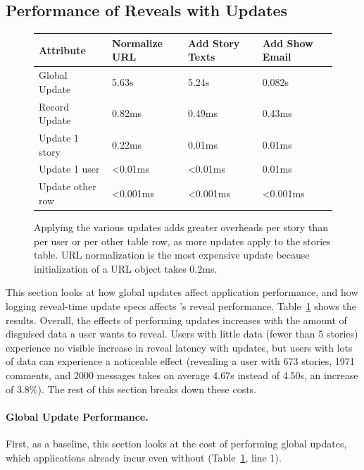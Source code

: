 \subsection{Performance of Reveals with Updates}
\label{s:eval:updates}

\begin{figure}
    \centering
    \begin{tabular}{m{}|m{}|m{}|m{}}
        \centering\textbf{Attribute} & \textbf{Normalize URL} & \textbf{Add Story Texts} &
        \textbf{Add Show Email} \\
        \hline
        Global Update & 5.63s & 5.24s & 0.082s\\
        \hline
        Record Update & 0.82ms & 0.49ms & 0.43ms \\
        \hline
        Update 1 story & 0.22ms & 0.01ms & 0.01ms \\
        \hline
        Update 1 user & <0.01ms & <0.01ms & 0.01ms \\
        \hline
        Update other row & <0.001ms & <0.001ms & <0.001ms \\
    \end{tabular}
    \caption[Overheads of global updates and reveal-time updates.]{Applying the various updates adds greater overheads per story than
    per user or per other table row, as more updates apply to the stories table.
    URL normalization is the most expensive update because initialization of a
    URL object takes 0.2ms.}
    \label{tab:updates-perf}
\end{figure}

This section looks at how global updates affect application performance, and how
logging reveal-time update specs affects \sys's reveal performance.
Table~\ref{tab:updates-perf} shows the results.
%
Overall, the effects of performing updates increases with the amount of
disguised data a user wants to reveal.
%
Users with little data (\eg fewer than 5 stories) experience no visible increase
in reveal latency with updates, but users with lots of data can experience a
noticeable effect (\eg revealing a user with 673 stories, 1971 comments, and 2000
messages takes on average 4.67s instead of 4.50s, an increase of 3.8\%).
%
The rest of this section breaks down these costs.
%

\paragraph{Global Update Performance.}
First, as a baseline, this section looks at the cost of performing
global updates, which
applications already incur even without \sys (Table~\ref{tab:updates-perf}, line 1).
%

